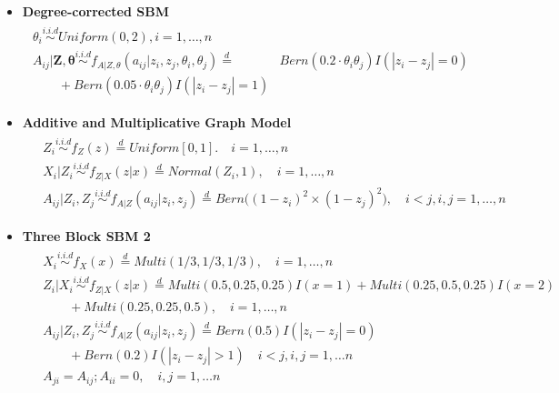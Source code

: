 \documentclass[12pt]{article}
\theoremstyle{definition}
\begin{document}
\begin{itemize}
	\item \textbf{Degree-corrected SBM}
	\begin{equation}
	\label{eq:dcSBM}
	\begin{gathered}
	\begin{split}
	\theta_{i} \overset{i.i.d}{\sim} Uniform(0,2), i = 1, \ldots, n \\ 
	A_{ij} | \mathbf{Z}, \mathbf{\theta}   \overset{i.i.d}{\sim}   f_{A|Z, \theta}(a_{ij} | z_{i}, z_{j}, \theta_{i}, \theta_{j}) \stackrel{d}{=} & Bern(0.2 \cdot \theta_{i}\theta_{j}) I ( |z_{i} - z_{j}| = 0 )  \\ \quad \quad + Bern(0.05 \cdot \theta_{i} \theta_{j} ) I(|z_{i} - z_{j}| = 1) 
	\end{split}
	\end{gathered}
	\end{equation}
	

\item \textbf{Additive and Multiplicative Graph Model}
\begin{equation}
	\label{eq:ame}
	\begin{gathered}
	\begin{aligned}
	&	Z_{i} \overset{i.i.d}{\sim} f_{Z}(z) \stackrel{d}{=} Uniform[0,1]. \quad i = 1, \ldots, n \\ 
	&	X_{i} | Z_{i} \overset{i.i.d}{\sim}  f_{Z|X}(z|x) \stackrel{d}{=}  Normal(Z_{i}, 1), \quad i= 1, \ldots, n \\
	&	A_{ij} | Z_{i}, Z_{j} \overset{i.i.d}{\sim}  f_{A|Z}(a_{ij} | z_{i}, z_{j}) \stackrel{d}{=}   Bern \big(  ( 1 - z_{i})^2 \times (1 - z_{j})^2    \big), \quad i < j, i,j = 1, \ldots, n
	\end{aligned}
	\end{gathered}
\end{equation}
	
\item \textbf{Three Block SBM 2}
\begin{equation}
\begin{gathered}
\begin{aligned}
& X_{i} \overset{i.i.d}{\sim} f_{X}(x)   \stackrel{d}{=}  Multi(1/3, 1/3, 1/3), \quad i = 1, \ldots , n \\ & Z_{i} | X_{i}  \overset{i.i.d}{\sim}    f_{Z|X}(z|x)  \stackrel{d}{=}   Multi(0.5, 0.25, 0.25) I( x = 1 ) +   Multi(0.25, 0.5, 0.25) I (x = 2)   \\ &  \quad \quad + Multi(0.25, 0.25, 0.5), \quad  i = 1,\ldots,n  \\
& A_{ij} | Z_{i}, Z_{j}   \overset{i.i.d}{\sim}   f_{A|Z}(a_{ij} | z_{i}, z_{j})  \stackrel{d}{=} Bern(0.5) I ( |z_{i} - z_{j}| = 0 ) \\  &  \quad \quad + Bern(0.2) I(|z_{i} - z_{j}| > 1) \quad i < j, i,j=1, \ldots n \\ & A_{ji} = A_{ij} ;   A_{ii} = 0,   \quad  i,j=1, \ldots n
\end{aligned}
\end{gathered}
\label{eq:simplethree}
\end{equation}

\end{itemize}
\end{document}
